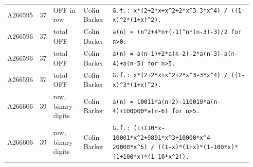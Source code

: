 \documentclass[11pt]{article}
\theoremstyle{definition}
\theoremstyle{remark}
\begin{document}
{\begin{longtable}{p{1.3cm}p{0.7cm}p{2.4cm}p{2.3cm}p{7.3cm}}
A266595 & 37 & OFF in row & Colin Barker & \texttt{G.f.: \allowbreak{}x*\allowbreak{}(2+\allowbreak{}2*\allowbreak{}x+\allowbreak{}x\^{}2+\allowbreak{}2*\allowbreak{}x\^{}3-\allowbreak{}3*\allowbreak{}x\^{}4)\allowbreak{} \allowbreak{}/\allowbreak{} \allowbreak{}((1-\allowbreak{}x)\allowbreak{}\^{}2*\allowbreak{}(1+\allowbreak{}x)\allowbreak{}\^{}2)\allowbreak{}.} \\
A266596 & 37 & total OFF & Colin Barker & \texttt{a(n)\allowbreak{} \allowbreak{}=\allowbreak{} \allowbreak{}(n\^{}2+\allowbreak{}4*\allowbreak{}n+\allowbreak{}(-\allowbreak{}1)\allowbreak{}\^{}n*\allowbreak{}(n-\allowbreak{}3)\allowbreak{}-\allowbreak{}3)\allowbreak{}/\allowbreak{}2 \allowbreak{}for \allowbreak{}n>0.} \\
A266596 & 37 & total OFF & Colin Barker & \texttt{a(n)\allowbreak{} \allowbreak{}=\allowbreak{} \allowbreak{}a(n-\allowbreak{}1)\allowbreak{}+\allowbreak{}2*\allowbreak{}a(n-\allowbreak{}2)\allowbreak{}-\allowbreak{}2*\allowbreak{}a(n-\allowbreak{}3)\allowbreak{}-\allowbreak{}a(n-\allowbreak{}4)\allowbreak{}+\allowbreak{}a(n-\allowbreak{}5)\allowbreak{} \allowbreak{}for \allowbreak{}n>5.} \\
A266596 & 37 & total OFF & Colin Barker & \texttt{G.f.: \allowbreak{}x*\allowbreak{}(2+\allowbreak{}2*\allowbreak{}x+\allowbreak{}x\^{}2+\allowbreak{}2*\allowbreak{}x\^{}3-\allowbreak{}3*\allowbreak{}x\^{}4)\allowbreak{} \allowbreak{}/\allowbreak{} \allowbreak{}((1-\allowbreak{}x)\allowbreak{}\^{}3*\allowbreak{}(1+\allowbreak{}x)\allowbreak{}\^{}2)\allowbreak{}.} \\
A266606 & 39 & row, binary digits & Colin Barker & \texttt{a(n)\allowbreak{} \allowbreak{}=\allowbreak{} \allowbreak{}10011*\allowbreak{}a(n-\allowbreak{}2)\allowbreak{}-\allowbreak{}110010*\allowbreak{}a(n-\allowbreak{}4)\allowbreak{}+\allowbreak{}100000*\allowbreak{}a(n-\allowbreak{}6)\allowbreak{} \allowbreak{}for \allowbreak{}n>5.} \\
A266606 & 39 & row, binary digits & Colin Barker & \texttt{G.f.: \allowbreak{}(1+\allowbreak{}110*\allowbreak{}x-\allowbreak{}10001*\allowbreak{}x\^{}2+\allowbreak{}9891*\allowbreak{}x\^{}3+\allowbreak{}10000*\allowbreak{}x\^{}4-\allowbreak{}20000*\allowbreak{}x\^{}5)\allowbreak{} \allowbreak{}/\allowbreak{} \allowbreak{}((1-\allowbreak{}x)\allowbreak{}*\allowbreak{}(1+\allowbreak{}x)\allowbreak{}*\allowbreak{}(1-\allowbreak{}100*\allowbreak{}x)\allowbreak{}*\allowbreak{}(1+\allowbreak{}100*\allowbreak{}x)\allowbreak{}*\allowbreak{}(1-\allowbreak{}10*\allowbreak{}x\^{}2)\allowbreak{})\allowbreak{}.} \\

\end{longtable}}
\end{document}
